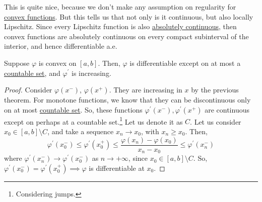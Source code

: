  This is quite nice, because we don't make any assumption on regularity for \hyperref[def:convex-function]{convex functions}. But this tells us that not only is it continuous, but also locally Lipschitz. Since every Lipschitz function is also \hyperref[def:absolutely-continuous-function]{absolutely continuous}, then convex functions are absolutely continuous on every compact subinterval of the interior, and hence differentiable a.e.

  \begin{theorem}
    \label{thm:convex-functions-are-differentiable-off-a}
    Suppose $\varphi$ is convex on $[a, b]$. Then, $\varphi$ is differentiable except on at most a \hyperref[st-def:countable]{countable set}, and $\varphi^\prime$ is increasing. 
  \end{theorem}
  \begin{proof}
    Consider $\varphi(x^-)$, $\varphi (x^+)$. They are increasing in $x$ by the previous theorem. For monotone functions, we know that they can be discontinuous only on at most \hyperref[st-def:countable]{countable set}.  So, these functions $\varphi^\prime (x^-), \varphi^\prime (x^+)$ are continuous except on perhaps at a countable set.\footnote{Considering jumps.} Let us denote it as $C$. Let us consider $x_0 \in [a, b] \setminus C$, and take a sequence $x_n \to x_0$, with $x_n \geq x_0$. Then, 
    \begin{equation}
      \varphi^\prime (x_0^-) \leq \varphi^\prime (x_0^+) \leq \frac{\varphi(x_n) - \varphi(x_0)}{x_n - x_0} \leq \varphi^\prime (x_n^-) 
    \end{equation}
    where $\varphi^\prime (x_n^-) \to \varphi^\prime (x_0^-)$ as $n \to +\infty$, since $x_0 \in [a, b] \setminus C$. So, $\varphi^\prime (x_0^-) = \varphi^\prime (x_0^+) \implies \varphi$ is differentiable at $x_0$. 
  \end{proof}

